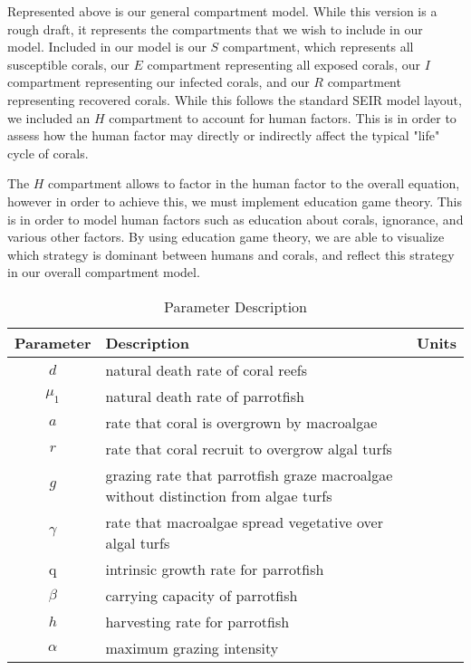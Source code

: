 \documentclass[12pt]{article}
\begin{document}
Represented above is our general compartment model. While this version is a rough draft, it represents the compartments that we wish to include in our model. Included in our model is our $S$ compartment, which represents all susceptible corals, our $E$ compartment representing all exposed corals, our $I$ compartment representing our infected corals, and our $R$ compartment representing recovered corals. While this follows the standard SEIR model layout, we included an $H$ compartment to account for human factors. This is in order to assess how the human factor may directly or indirectly affect the typical "life" cycle of corals. \par
The $H$ compartment allows to factor in the human factor to the overall equation, however in order to achieve this, we must implement education game theory. This is in order to model human factors such as education about corals, ignorance, and various other factors. By using education game theory, we are able to visualize which strategy is dominant between humans and corals, and reflect this strategy in our overall compartment model.

\begin{table}[H]
    \centering
    \begin{tabular}{c p{9cm} c}
        \hline
        Parameter & Description & Units  \\
        \hline
        \hline
        $d$ & natural death rate of coral reefs & \\
        $\mu_{1}$ & natural death rate of parrotfish & \\
        $a$ & rate that coral is overgrown by macroalgae & \\
        $r$ & rate that coral recruit to overgrow algal turfs & \\
        $g$ & grazing rate that parrotfish graze macroalgae without distinction from algae turfs & \\
        $\gamma$ & rate that macroalgae spread vegetative over algal turfs & \\
        q & intrinsic growth rate for parrotfish & \\
        $\beta$ & carrying capacity of parrotfish & \\
        $h$ & harvesting rate for parrotfish & \\
        $\alpha$ & maximum grazing intensity & \\
        \hline
    \end{tabular}
    \caption{Parameter Description}
    \label{tab:my_label}
\end{table}
\end{document}
